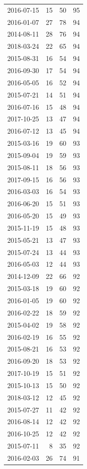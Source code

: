\begin{tabular}{lrrr}
2016-07-15 & 15 & 50 & 95 \\
2016-01-07 & 27 & 78 & 94 \\
2014-08-11 & 28 & 76 & 94 \\
2018-03-24 & 22 & 65 & 94 \\
2015-08-31 & 16 & 54 & 94 \\
2016-09-30 & 17 & 54 & 94 \\
2016-05-05 & 16 & 52 & 94 \\
2015-07-21 & 14 & 51 & 94 \\
2016-07-16 & 15 & 48 & 94 \\
2017-10-25 & 13 & 47 & 94 \\
2016-07-12 & 13 & 45 & 94 \\
2015-03-16 & 19 & 60 & 93 \\
2015-09-04 & 19 & 59 & 93 \\
2015-08-11 & 18 & 56 & 93 \\
2017-09-15 & 16 & 56 & 93 \\
2016-03-03 & 16 & 54 & 93 \\
2016-06-20 & 15 & 51 & 93 \\
2016-05-20 & 15 & 49 & 93 \\
2015-11-19 & 15 & 48 & 93 \\
2015-05-21 & 13 & 47 & 93 \\
2015-07-24 & 13 & 44 & 93 \\
2016-05-03 & 12 & 44 & 93 \\
2014-12-09 & 22 & 66 & 92 \\
2015-03-18 & 19 & 60 & 92 \\
2016-01-05 & 19 & 60 & 92 \\
2016-02-22 & 18 & 59 & 92 \\
2015-04-02 & 19 & 58 & 92 \\
2016-02-19 & 16 & 55 & 92 \\
2015-08-21 & 16 & 53 & 92 \\
2016-09-20 & 18 & 53 & 92 \\
2017-10-19 & 15 & 51 & 92 \\
2015-10-13 & 15 & 50 & 92 \\
2018-03-12 & 12 & 45 & 92 \\
2015-07-27 & 11 & 42 & 92 \\
2016-08-14 & 12 & 42 & 92 \\
2016-10-25 & 12 & 42 & 92 \\
2015-07-11 & 8 & 35 & 92 \\
2016-02-03 & 26 & 74 & 91 \\

\end{tabular}
